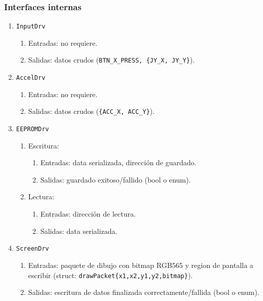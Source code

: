 \documentclass[11pt,a4paper]{article}
\begin{document}
\subsubsection{Interfaces internas}
\begin{enumerate}
  \item \texttt{InputDrv}
    \begin{enumerate}
      \item Entradas: no requiere.
      \item Salidas: datos crudos (\texttt{BTN\_X\_PRESS, \{JY\_X, JY\_Y\}}).
    \end{enumerate}
  \item \texttt{AccelDrv}
    \begin{enumerate}
      \item Entradas: no requiere.
      \item Salidas: datos crudos (\texttt{\{ACC\_X, ACC\_Y\}}).
    \end{enumerate}
  \item \texttt{EEPROMDrv}
    \begin{enumerate}
      \item Escritura:
      \begin{enumerate}
        \item Entradas: data serializada, dirección de guardado.
        \item Salidas: guardado exitoso/fallido (bool o enum).
      \end{enumerate}
      \item Lectura:
      \begin{enumerate}
        \item Entradas: dirección de lectura.
        \item Salidas: data serializada.
      \end{enumerate}
    \end{enumerate}
  \item \texttt{ScreenDrv}
    \begin{enumerate}
      \item Entradas: paquete de dibujo con bitmap RGB565 y region de pantalla a escribir (struct: \texttt{drawPacket\{x1,x2,y1,y2,bitmap\}}).
      \item Salidas: escritura de datos finalizada correctamente/fallida (bool o enum).
    \end{enumerate}

\end{enumerate}
\end{document}
